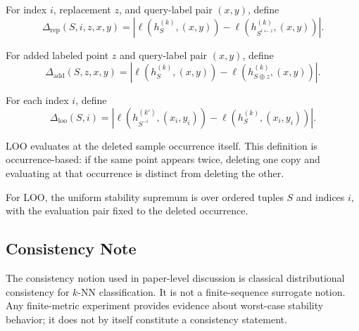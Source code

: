 \begin{definition}
For index $i$, replacement $z$, and query-label pair $(x, y)$, define
\[
\Delta_{\mathrm{rep}}(S, i, z, x, y)
=
\left| \ell(h_S^{(k)}, (x, y)) - \ell(h_{S^{i \leftarrow z}}^{(k)}, (x, y)) \right|.
\]
\end{definition}

\begin{definition}
For added labeled point $z$ and query-label pair $(x, y)$, define
\[
\Delta_{\mathrm{add}}(S, z, x, y)
=
\left| \ell(h_S^{(k)}, (x, y)) - \ell(h_{S \oplus z}^{(k)}, (x, y)) \right|.
\]
\end{definition}

\begin{definition}
For each index $i$, define
\[
\Delta_{\mathrm{loo}}(S, i)
=
\left| \ell(h_{S^{-i}}^{(k')}, (x_i, y_i)) - \ell(h_S^{(k)}, (x_i, y_i)) \right|.
\]
\end{definition}

LOO evaluates at the deleted sample occurrence itself. This definition is occurrence-based: if the same point appears twice, deleting one copy and evaluating at that occurrence is distinct from deleting the other.

For LOO, the uniform stability supremum is over ordered tuples $S$ and indices $i$, with the evaluation pair fixed to the deleted occurrence.

\subsection{Consistency Note}

The consistency notion used in paper-level discussion is classical distributional consistency for $k$-NN classification. It is not a finite-sequence surrogate notion. Any finite-metric experiment provides evidence about worst-case stability behavior; it does not by itself constitute a consistency statement.


